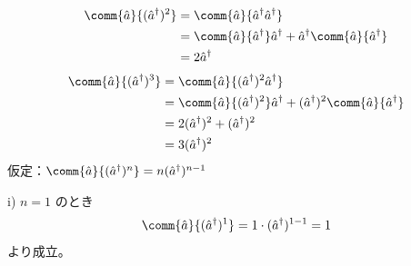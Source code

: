 \begin{align*}
\comm{\hat{a}}{(\hat{a}^{\dagger})^{2}}&=\comm{\hat{a}}{\hat{a}^{\dagger}\hat{a}^{\dagger}}\\
&=\comm{\hat{a}}{\hat{a}^{\dagger}}\hat{a}^{\dagger}+\hat{a}^{\dagger}\comm{\hat{a}}{\hat{a}^{\dagger}}\\
&=2\hat{a}^{\dagger}
\end{align*}
\begin{align*}
\comm{\hat{a}}{(\hat{a}^{\dagger})^{3}}&=\comm{\hat{a}}{(\hat{a}^{\dagger})^{2}\hat{a}^{\dagger}}\\
&=\comm{\hat{a}}{(\hat{a}^{\dagger})^{2}}\hat{a}^{\dagger}+(\hat{a}^{\dagger})^{2}\comm{\hat{a}}{\hat{a}^{\dagger}}\\
&=2(\hat{a}^{\dagger})^{2}+(\hat{a}^{\dagger})^{2}\\
&=3(\hat{a}^{\dagger})^{2}
\end{align*}
仮定：$\comm{\hat{a}}{(\hat{a}^{\dagger})^{n}}=n(\hat{a}^{\dagger})^{n-1}$

i) $n=1$ のとき
\[ \comm{\hat{a}}{(\hat{a}^{\dagger})^{1}}=1\cdot(\hat{a}^{\dagger})^{1-1}=1 \]
より成立。

